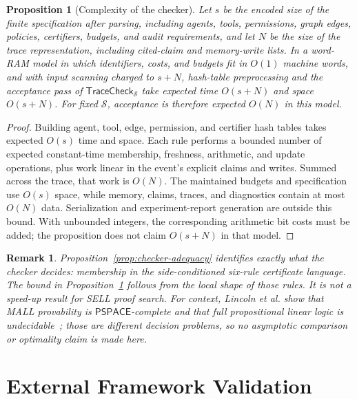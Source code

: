 \documentclass[a4paper,fleqn]{cas-sc}
\newtheorem{proposition}{Proposition}
\newtheorem{remark}{Remark}
\newcommand{\TraceCheck}{\mathsf{TraceCheck}}
\begin{document}
\begin{proposition}[Complexity of the checker]\label{prop:checker-complexity}
Let \(s\) be the encoded size of the finite specification after parsing,
including agents, tools, permissions, graph edges, policies, certifiers,
budgets, and audit requirements, and let \(N\) be the size of the trace
representation, including cited-claim and memory-write lists. In a word-RAM
model in which identifiers, costs, and budgets fit in \(O(1)\) machine words,
and with input scanning charged to \(s+N\), hash-table preprocessing and the
acceptance pass of \(\TraceCheck_{\mathcal{S}}\) take expected time
\(O(s+N)\) and space \(O(s+N)\). For fixed \(\mathcal{S}\), acceptance is
therefore expected \(O(N)\) in this model.
\end{proposition}

\begin{proof}
Building agent, tool, edge, permission, and certifier hash tables takes expected
\(O(s)\) time and space. Each rule performs a bounded number of expected
constant-time membership, freshness, arithmetic, and update operations, plus
work linear in the event's explicit claims and writes. Summed across the trace,
that work is \(O(N)\). The maintained budgets and specification use \(O(s)\)
space, while memory, claims, traces, and diagnostics contain at most \(O(N)\)
data. Serialization and experiment-report generation are outside this bound.
With unbounded integers, the corresponding arithmetic bit costs must be added;
the proposition does not claim \(O(s+N)\) in that model.
\end{proof}

\begin{remark}
Proposition~\ref{prop:checker-adequacy} identifies exactly what the checker
decides: membership in the side-conditioned six-rule certificate language. The
bound in Proposition~\ref{prop:checker-complexity} follows from the local shape
of those rules. It is not a speed-up result for SELL proof search. For context,
Lincoln et al. show that MALL provability is \(\mathsf{PSPACE}\)-complete and
that full propositional linear logic is undecidable~\cite{lincoln1992}; those are
different decision problems, so no asymptotic comparison or optimality claim is
made here.
\end{remark}

\section{External Framework Validation}\label{sec:external-validation}
\end{document}
